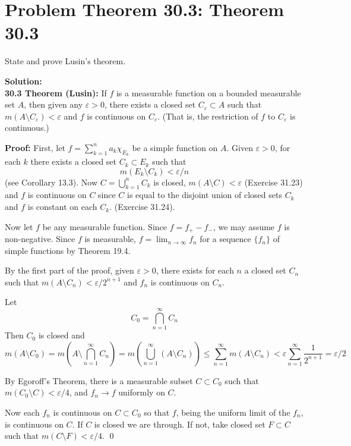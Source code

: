 \documentclass[a4paper]{article}
\theoremstyle{definition}
\newcounter{problem}
\newenvironment{problem}[1][]
{
    \stepcounter{problem}
    \section*{Problem \theproblem\ifx\relax#1\relax\else: #1\fi}
}
{}
\newenvironment{solution}
{
    \noindent\textbf{Solution:}\\
}
{
    
}
\begin{document}
\newpage
\begin{problem}[Theorem 30.3]

State and prove Lusin's theorem.

\end{problem}

\vspace{2em}
\begin{solution}
\textbf{30.3 \quad Theorem (Lusin):} If $f$ is a measurable function on a bounded measurable set $A$, then given any $\varepsilon > 0$, there exists a closed set $C_\varepsilon \subset A$ such that $m(A \setminus C_\varepsilon) < \varepsilon$ and $f$ is continuous on $C_\varepsilon$. (That is, the restriction of $f$ to $C_\varepsilon$ is continuous.)

\medskip

\textbf{Proof:} First, let 
$f = \sum_{k=1}^{n} a_k \chi_{E_k}$
be a simple function on $A$. Given $\varepsilon > 0$, for each $k$ there exists a closed set $C_k \subset E_k$ such that
\[
m(E_k \setminus C_k) < \varepsilon / n
\]
(see Corollary 13.3). Now $ C = \bigcup_{k=1}^{n} C_k $ is closed, $m(A \setminus C) < \varepsilon$ (Exercise 31.23) and $f$ is continuous on $C$ since $C$ is equal to the disjoint union of closed sets $C_k$ and $f$ is constant on each $C_k$. (Exercise 31.24).

\medskip

Now let $f$ be any measurable function. Since $f = f_+ - f_-$, we may assume $f$ is non-negative. Since $f$ is measurable, $ f = \lim_{n \to \infty} f_n $ for a sequence $\{f_n\}$ of simple functions by Theorem 19.4.

\medskip

By the first part of the proof, given $\varepsilon > 0$, there exists for each $n$ a closed set $C_n$ such that $m(A \setminus C_n) < \varepsilon / 2^{n+1}$ and $f_n$ is continuous on $C_n$.

\medskip

Let 
\[
C_0 = \bigcap_{n=1}^{\infty} C_n
\]
Then $C_0$ is closed and
\[
m(A \setminus C_0)
= m\!\left(A \setminus \bigcap_{n=1}^{\infty} C_n\right)
= m\!\left(\bigcup_{n=1}^{\infty} (A \setminus C_n)\right)
\le \sum_{n=1}^{\infty} m(A \setminus C_n)
< \varepsilon \sum_{n=1}^{\infty} \frac{1}{2^{n+1}}
= \varepsilon/2
\]

By Egoroff's Theorem, there is a measurable subset $C \subset C_0$ such that $m(C_0 \setminus C) < \varepsilon/4$, and $f_n \to f$ uniformly on $C$.

\medskip

Now each $f_n$ is continuous on $C \subset C_0$ so that $f$, being the uniform limit of the $f_n$, is continuous on $C$. If $C$ is closed we are through. If not, take closed set $F \subset C$ such that $m(C \setminus F) < \varepsilon/4$. \qed
\end{solution}
\end{document}
